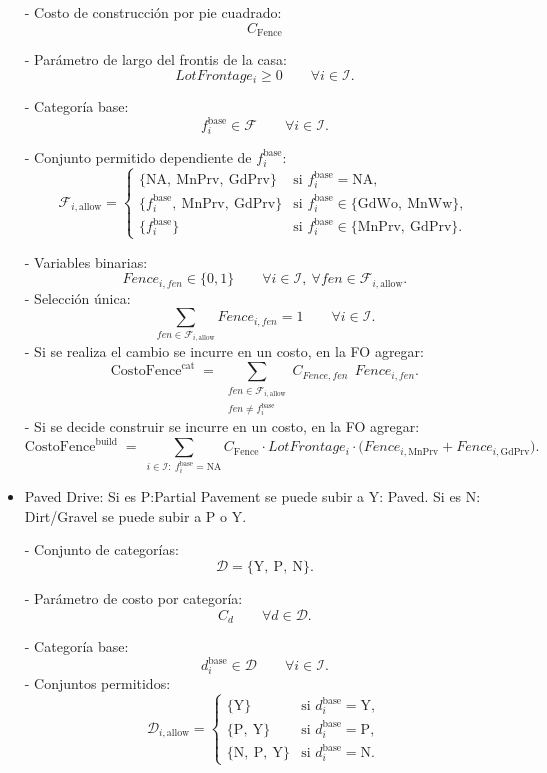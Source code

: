 \begin{itemize}
- Costo de construcción por pie cuadrado:
\[
  C_{\text{Fence}}
\]

- Parámetro de largo del frontis de la casa:
\[
  LotFrontage_i \ge 0 \qquad \forall i \in \mathcal{I}.
\]

- Categoría base:
\[
  f_i^{\text{base}} \in \mathcal{F} \qquad \forall i \in \mathcal{I}.
\]

- Conjunto permitido dependiente de $f_i^{\text{base}}$:
\[
  \mathcal{F}_{i,\text{allow}} =
  \begin{cases}
    \{\text{NA},\ \text{MnPrv},\ \text{GdPrv}\} 
      & \text{si } f_i^{\text{base}}=\text{NA},\\[4pt]
    \{f_i^{\text{base}},\ \text{MnPrv},\ \text{GdPrv}\} 
      & \text{si } f_i^{\text{base}}\in\{\text{GdWo},\ \text{MnWw}\},\\[4pt]
    \{f_i^{\text{base}}\}
      & \text{si } f_i^{\text{base}}\in\{\text{MnPrv},\ \text{GdPrv}\}.
  \end{cases}
\]

- Variables binarias:
\[
  Fence_{i,fen} \in \{0,1\} 
  \qquad \forall i \in \mathcal{I},\ \forall fen \in \mathcal{F}_{i,\text{allow}}.
\]
- Selección única:
\[
  \sum_{fen \in \mathcal{F}_{i,\text{allow}}} Fence_{i,fen} = 1
  \qquad \forall i \in \mathcal{I}.
\]
- Si se realiza el cambio se incurre en un costo, en la FO agregar:
\[
  \text{CostoFence}^{\text{cat}}
  \;=\;
  \sum_{\substack{fen \in \mathcal{F}_{i,\text{allow}} \\ fen \neq f_i^{\text{base}}}}
  C_{Fence, fen}\;\, Fence_{i,fen}.
\]
- Si se decide construir se incurre en un costo, en la FO agregar:
\[
  \text{CostoFence}^{\text{build}}
  \;=\;
  \sum_{i \in \mathcal{I}: \ f_i^{\text{base}}=\text{NA}}
  C_{\text{Fence}} \cdot LotFrontage_i \cdot 
  \Big( Fence_{i,\text{MnPrv}} + Fence_{i,\text{GdPrv}} \Big).
\]

    \item Paved Drive: Si es P:Partial Pavement se puede subir a Y: Paved. Si es N: Dirt/Gravel  se puede subir a P o Y. 

- Conjunto de categorías:
\[
  \mathcal{D} = \{\text{Y},\ \text{P},\ \text{N}\}.
\]

- Parámetro de costo por categoría:
\[
  C_d \qquad \forall d \in \mathcal{D}.
\]

- Categoría base:
\[
  d_i^{\text{base}} \in \mathcal{D} \qquad \forall i \in \mathcal{I}.
\]
- Conjuntos permitidos:
\[
  \mathcal{D}_{i,\text{allow}} =
  \begin{cases}
    \{\text{Y}\} & \text{si } d_i^{\text{base}}=\text{Y},\\[3pt]
    \{\text{P},\ \text{Y}\} & \text{si } d_i^{\text{base}}=\text{P},\\[3pt]
    \{\text{N},\ \text{P},\ \text{Y}\} & \text{si } d_i^{\text{base}}=\text{N}.
  \end{cases}
\]


\end{itemize}
